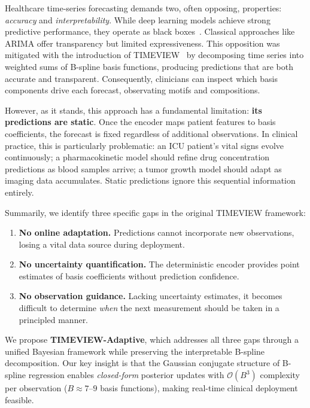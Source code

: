 \documentclass[final]{article}
\begin{document}
Healthcare time-series forecasting demands two, often opposing, properties: \emph{accuracy} and \emph{interpretability}. While deep learning models achieve strong predictive performance, they operate as black boxes~\citep{lim2021temporal}. Classical approaches like ARIMA offer transparency but limited expressiveness. This opposition was mitigated with the introduction of TIMEVIEW~\citep{kacprzyk2024towards} by decomposing time series into weighted sums of B-spline basis functions, producing predictions that are both accurate and transparent. Consequently, clinicians can inspect which basis components drive each forecast, observating motifs and compositions.

However, as it stands, this approach has a fundamental limitation: \textbf{its predictions are static}. Once the encoder maps patient features to basis coefficients, the forecast is fixed regardless of additional observations. In clinical practice, this is particularly problematic: an ICU patient's vital signs evolve continuously; a pharmacokinetic model should refine drug concentration predictions as blood samples arrive; a tumor growth model should adapt as imaging data accumulates. Static predictions ignore this sequential information entirely.

Summarily, we identify three specific gaps in the original TIMEVIEW framework:
\begin{enumerate}
    \item \textbf{No online adaptation.} Predictions cannot incorporate new observations, losing a vital data source during deployment.
    \item \textbf{No uncertainty quantification.} The deterministic encoder provides point estimates of basis coefficients without prediction confidence.
    \item \textbf{No observation guidance.} Lacking uncertainty estimates, it becomes difficult to determine \emph{when} the next measurement should be taken in a principled manner.
\end{enumerate}

We propose \textbf{TIMEVIEW-Adaptive}, which addresses all three gaps through a unified Bayesian framework while preserving the interpretable B-spline decomposition. Our key insight is that the Gaussian conjugate structure of B-spline regression enables \emph{closed-form} posterior updates with $\mathcal{O}(B^3)$ complexity per observation ($B \approx 7$--$9$ basis functions), making real-time clinical deployment feasible.
\end{document}
